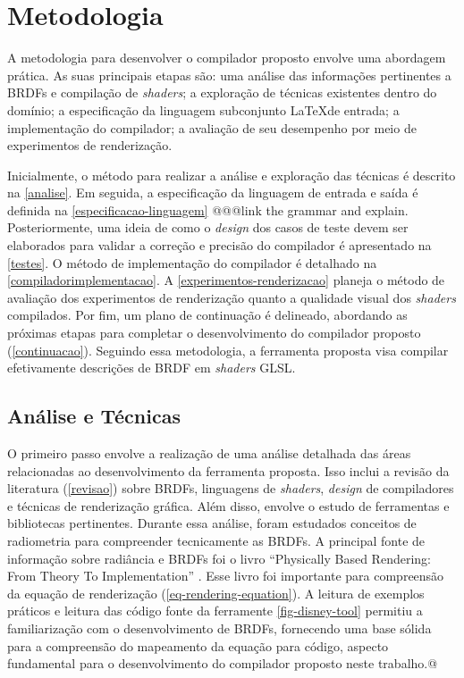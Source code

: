 \chapter{Metodologia} \label{metodologia}

A metodologia para desenvolver o compilador proposto envolve uma abordagem prática. As suas principais etapas são: uma análise das informações pertinentes a BRDFs e compilação de \textit{shaders}; a exploração de técnicas existentes dentro do domínio; a especificação da linguagem subconjunto \LaTeX de entrada;  a implementação do compilador; a avaliação de seu desempenho por meio de experimentos de renderização.

Inicialmente, o método para realizar a análise e exploração das técnicas é descrito na \autoref{analise}. Em seguida, a especificação da linguagem de entrada e saída é definida na \autoref{especificacao-linguagem} @@@{link the grammar and explain}. Posteriormente, uma ideia de como o \textit{design} dos casos de teste devem ser elaborados para validar a correção e precisão do compilador é apresentado na \autoref{testes}. O método de implementação do compilador é detalhado na \autoref{compiladorimplementacao}. A \autoref{experimentos-renderizacao} planeja o método de avaliação dos experimentos de renderização quanto a qualidade visual dos \textit{shaders} compilados. Por fim, um plano de continuação é delineado, abordando as próximas etapas para completar o desenvolvimento do compilador proposto (\autoref{continuacao}).
Seguindo essa metodologia, a ferramenta proposta visa compilar efetivamente descrições de BRDF em \textit{shaders} GLSL.


\section{Análise e Técnicas} \label{analise}




O primeiro passo envolve a realização de uma análise detalhada das áreas relacionadas ao desenvolvimento da ferramenta proposta. Isso inclui a revisão da literatura (\autoref{revisao}) sobre BRDFs, linguagens de \textit{shaders}, \textit{design} de compiladores e técnicas de renderização gráfica. Além disso, envolve o estudo de ferramentas e bibliotecas pertinentes. Durante essa análise, foram estudados conceitos de radiometria para compreender tecnicamente as BRDFs. A principal fonte de informação sobre radiância e BRDFs foi o livro ``Physically Based Rendering: From Theory To Implementation'' \cite{pbr}. Esse livro foi importante para compreensão da equação de renderização (\autoref{eq-rendering-equation}). A leitura de exemplos práticos e leitura das código fonte da ferramente \autoref{fig-disney-tool} permitiu a familiarização com o desenvolvimento de BRDFs, fornecendo uma base sólida para a compreensão do mapeamento da equação para código, aspecto fundamental para o desenvolvimento do compilador proposto neste trabalho.@

